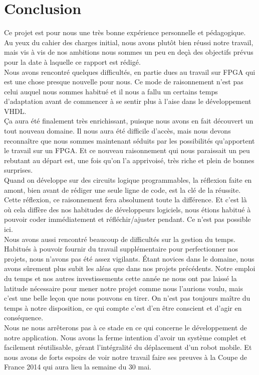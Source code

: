 %

\section{Conclusion}
Ce projet est pour nous une très bonne expérience personnelle et pédagogique.\\
Au yeux du cahier des charges initial, nous avons plutôt bien réussi notre travail, mais vis à vis de nos ambitions nous sommes un peu en deçà des objectifs prévus pour la date à laquelle ce rapport est rédigé.\\

Nous avons rencontré quelques difficultés, en partie dues au travail sur FPGA qui est une chose presque nouvelle pour nous. Ce mode de raisonnement n'est pas celui auquel nous sommes habitué et il nous a fallu un certains temps d'adaptation avant de commencer à se sentir plus à l'aise dans le développement VHDL.\\
Ça aura été finalement très enrichissant, puisque nous avons en fait découvert un tout nouveau domaine. Il nous aura été difficile d'accès, mais nous devons reconna\^itre que nous sommes maintenant séduits par les possibilités qu'apportent le travail sur un FPGA. Et ce nouveau raisonnement qui nous paraissait un peu rebutant au départ est, une fois qu'on l'a apprivoisé, très riche et plein de bonnes surprises.\\
Quand on développe sur des circuits logique programmables, la réflexion faite en amont, bien avant de rédiger une seule ligne de code, est la clé de la réussite. Cette réflexion, ce raisonnement fera absolument toute la différence. Et c'est là où cela diffère des nos habitudes de développeurs logiciels, nous étions habitué à pouvoir coder immédiatement et réfléchir/ajuster pendant. Ce n'est pas possible ici.\\

Nous avons aussi rencontré beaucoup de difficultés sur la gestion du temps. Habitués à pouvoir fournir du travail supplémentaire pour perfectionner nos projets, nous n'avons pas été assez vigilants. Étant novices dans le domaine, nous avons sûrement plus subit les aléas  que dans nos projets précédents. Notre emploi du temps et nos autres investissements cette année ne nous ont pas laissé la latitude nécessaire pour mener notre projet comme nous l'aurions voulu, mais c'est une belle leçon que nous pouvons en tirer. On n'est pas toujours ma\^itre du temps à notre disposition, ce qui compte c'est d'en \^etre conscient et d'agir en conséquence.\\


Nous ne nous arr\^eterons pas à ce stade en ce qui concerne le développement de notre application. Nous avons la ferme intention d'avoir un système complet et facilement réutilisable, gérant l'intégralité du déplacement d'un robot mobile. Et nous avons de forts espoirs de voir notre travail faire ses preuves à la Coupe de France 2014 qui aura lieu la semaine du 30 mai.\\